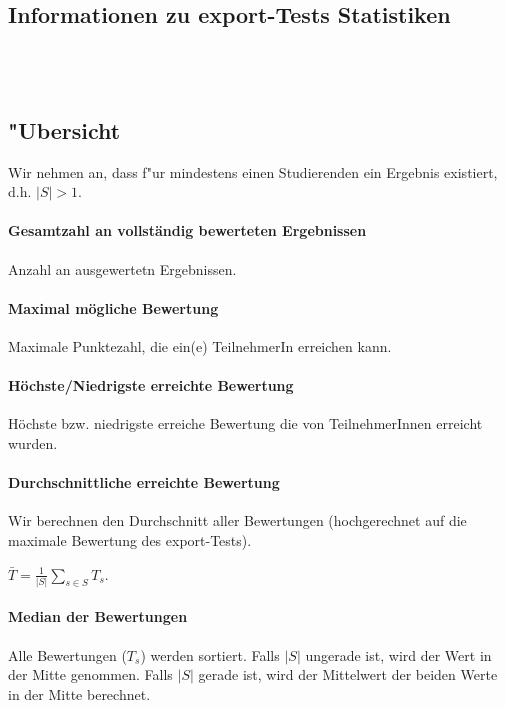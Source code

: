 \documentclass[12pt]{report}
\begin{document}
\subsection{Informationen zu export-Tests Statistiken}

\ \\
\ \\

\subsection{"Ubersicht}
\label{subsubsec:overview}

Wir nehmen an, dass f"ur mindestens einen Studierenden ein Ergebnis existiert, d.h. $|S|>1$.

\paragraph{Gesamtzahl an vollständig bewerteten Ergebnissen}
Anzahl an ausgewertetn Ergebnissen.

\paragraph{Maximal mögliche Bewertung}
Maximale Punktezahl, die ein(e) TeilnehmerIn erreichen kann.

\paragraph{Höchste/Niedrigste erreichte Bewertung}
Höchste bzw. niedrigste erreiche Bewertung die von TeilnehmerInnen erreicht wurden.

\paragraph{Durchschnittliche erreichte Bewertung}
Wir berechnen den Durchschnitt aller Bewertungen (hochgerechnet auf die maximale Bewertung des export-Tests).

$\bar{T}=\frac{1}{|S|}\sum\limits_{s\in S}T_s$.

\paragraph{Median der Bewertungen}
Alle Bewertungen ($T_s$) werden sortiert. Falls $|S|$ ungerade ist, wird der Wert in der Mitte genommen. Falls $|S|$ gerade ist, wird der Mittelwert der beiden Werte in der Mitte berechnet. 
\end{document}
